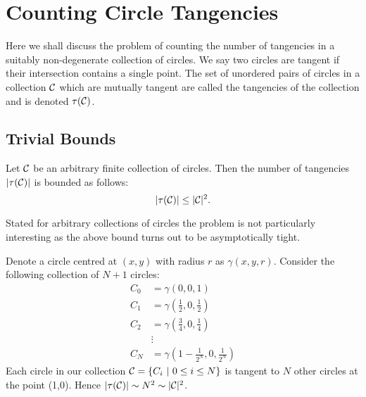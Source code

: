 \chapter{Counting Circle Tangencies\label{chap:circle}}

Here we shall discuss the problem of counting the number of tangencies in a suitably non-degenerate collection of circles. We say two circles are tangent if their intersection contains a single point.
The set of unordered pairs of circles in a collection $\mathcal C$ which are mutually tangent are called the tangencies of the collection and is denoted $\tau(\mathcal C)$. 
\section{Trivial Bounds}
\begin{theorem} \label{thm:trivial-circle-bound}
    Let $\mathcal C$ be an arbitrary finite collection of circles. Then the number of tangencies $|\tau(\mathcal C)|$ is bounded as follows:
    \[
        |\tau(\mathcal C)| \leq |\mathcal C|^2.
    \] 
\end{theorem}
Stated for arbitrary collections of circles the problem is not particularly interesting as the above bound turns out to be asymptotically tight. 
\begin{example}
Denote a circle centred at $(x,y)$ with radius $r$ as $\gamma (x,y,r)$.
Consider the following collection of $N+1$ circles:
\begin{align*}
    C_0 &= \gamma\left(0,0,1\right) \\
    C_1 &= \gamma\left(\frac{1}{2},0,\frac{1}{2}\right) \\
    C_2 &= \gamma\left(\frac{3}{4},0, \frac{1}{4}\right) \\
    &\vdots \\
    C_N &= \gamma\left(1- \frac{1}{2^N}, 0, \frac{1}{2^N}\right)
\end{align*}
Each circle in our collection $\mathcal C = \{ C_i \ | \ 0 \leq i \leq N\}$ is tangent to $N$ other circles at the point (1,0). 
Hence $|\tau(\mathcal C)| \sim N^2 \sim |\mathcal C|^2$. 
\end{example}


